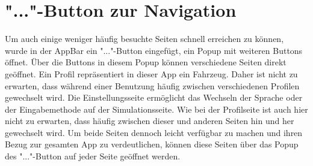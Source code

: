 	\section{"..."-Button zur Navigation}
	\label{sec:change-prof}
    Um auch einige weniger häufig besuchte Seiten schnell erreichen zu können, wurde in der AppBar ein "..."-Button eingefügt, ein Popup mit weiteren Buttons öffnet. Über die Buttons in diesem Popup können verschiedene Seiten direkt geöffnet.
    Ein Profil repräsentiert in dieser App ein Fahrzeug. Daher ist nicht zu erwarten, dass während einer Benutzung häufig zwischen verschiedenen Profilen gewechselt wird.
    Die Einstellungsseite ermöglicht das Wechseln der Sprache oder der Eingabemethode auf der Simulationsseite. Wie bei der Profilseite ist auch hier nicht zu erwarten, dass häufig zwischen dieser und anderen Seiten hin und her gewechselt wird. Um beide Seiten dennoch leicht verfügbar zu machen und ihren Bezug zur gesamten App zu verdeutlichen, können diese Seiten über das Popup des "..."-Button auf jeder Seite geöffnet werden.